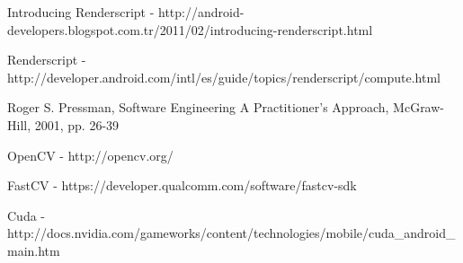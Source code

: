 \documentclass[12pt, a4paper]{article} \pagenumbering{gobble}
\begin{document}
\newpage
          \begin{thebibliography}{9}
            Introducing Renderscript -
              http://android-developers.blogspot.com.tr/2011/02/introducing-renderscript.html

            Renderscript - http://developer.android.com/intl/es/guide/topics/renderscript/compute.html

            Roger S. Pressman, Software Engineering A Practitioner's Approach,
            McGraw-Hill, 2001, pp. 26-39

            OpenCV -  http://opencv.org/

            FastCV - https://developer.qualcomm.com/software/fastcv-sdk

          Cuda - http://docs.nvidia.com/gameworks/content/technologies/mobile/cuda\_android\_main.htm

          \end{thebibliography}
\end{document}

